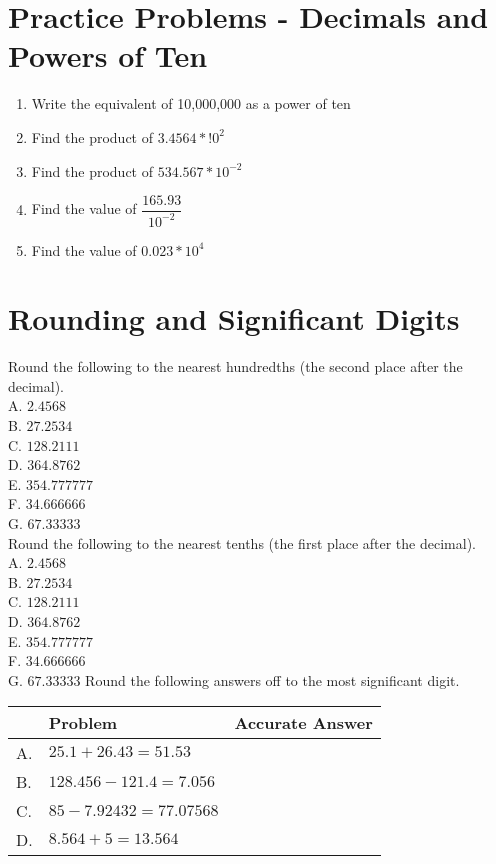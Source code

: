 \documentclass{article}
\begin{document}
\vspace{1cm}
\section{Practice Problems - Decimals and Powers of Ten}
\begin{enumerate}
\item Write the equivalent of 10,000,000 as a power of ten
\item Find the product of $3.4564*!0^2$
\item Find the product of $534.567*10^{-2}$
\vspace{0.2cm}
\item Find the value of $\dfrac{165.93}{10^{-2}}$
\vspace{0.2cm}
\item Find the value of $0.023*10^4$
\end{enumerate}
\vspace{1cm}

\section{Rounding and Significant Digits}
Round the following to the nearest hundredths (the second place after the decimal).\\
A. $2.4568$\\
B. $27.2534$\\
C. $128.2111$\\
D. $364.8762$\\
E. $354.777777$\\
F. $34.666666$\\
G. $67.33333$\\
\vspace{0.5cm}
Round the following to the nearest tenths (the first place after the decimal).\\
A. $2.4568$\\
B. $27.2534$\\
C. $128.2111$\\
D. $364.8762$\\
E. $354.777777$\\
F. $34.666666$\\
G. $67.33333$
\vspace{1cm}
Round the following answers off to the most significant digit.\\

\begin{tabular}{|l|l|l|}
\hline
 & Problem & Accurate Answer \\
\hline
A. & $25.1+26.43=51.53$ &  \\
\hline
B. & $128.456-121.4=7.056$ &  \\
\hline
C. & $85-7.92432=77.07568$ &  \\
\hline
D. & $8.564+5=13.564$ &  \\
\hline
\end{tabular}
\end{document}
